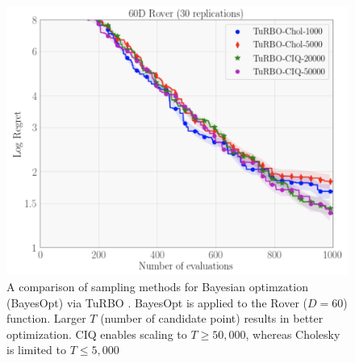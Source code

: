 \begin{figure}[t!]
  \centering
  \includegraphics[width=0.7\linewidth]{figures/rover.png}
  \caption[
    A comparison of sampling methods for Bayesian optimzation (BayesOpt) via TuRBO \cite{eriksson2019scalable}.
    BayesOpt is applied to the Rover ($D=60$) function.
  ]{
    A comparison of sampling methods for Bayesian optimzation (BayesOpt) via TuRBO \cite{eriksson2019scalable}.
    BayesOpt is applied to the Rover ($D=60$) function.
    Larger $T$ (number of candidate point) results in better optimization.
    CIQ enables scaling to $T\geq50,\!000$, whereas Cholesky is limited to $T\leq5,\!000$
  }
  \label{fig:hartmann6}
\end{figure}
